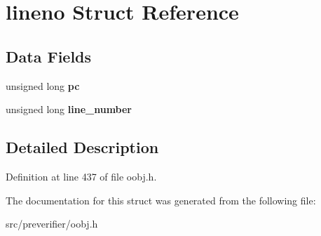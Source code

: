 \section{lineno Struct Reference}
\label{structlineno}
\subsection*{Data Fields}
\begin{DoxyCompactItemize}
\item 
unsigned long {\bfseries pc}\label{structlineno_a3aadcfe5aca22efdf01016d4595c2990}

\item 
unsigned long {\bfseries line\_\-number}\label{structlineno_a083fb47b8db89a5f9bd06f3b1789efc0}

\end{DoxyCompactItemize}


\subsection{Detailed Description}


Definition at line 437 of file oobj.h.



The documentation for this struct was generated from the following file:\begin{DoxyCompactItemize}
\item 
src/preverifier/oobj.h\end{DoxyCompactItemize}
